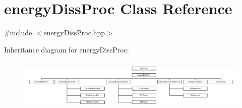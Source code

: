 \hypertarget{classenergyDissProc}{\section{energy\-Diss\-Proc Class Reference}
\label{classenergyDissProc}
}


{\ttfamily \#include $<$energy\-Diss\-Proc.\-hpp$>$}

Inheritance diagram for energy\-Diss\-Proc\-:\begin{figure}[H]
\begin{center}
\leavevmode
\includegraphics[height=2.456140cm]{classenergyDissProc}
\end{center}
\end{figure}


